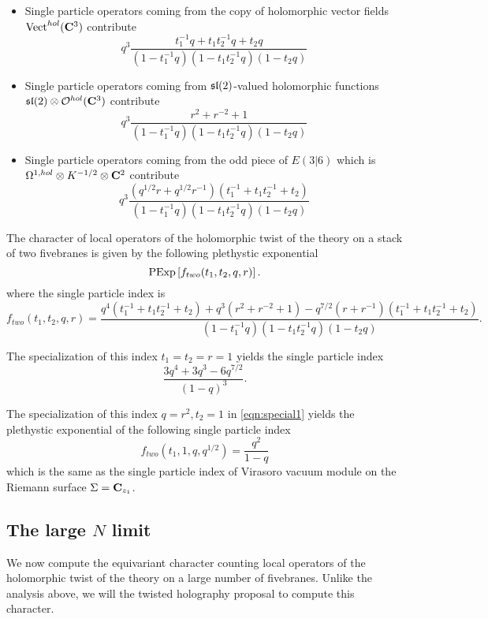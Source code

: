 \begin{itemize}
\item Single particle operators coming from the copy of holomorphic vector fields $\operatorname{Vect}^{hol}(\mathbf{C}^3)$ contribute
\[
q^3 \frac{t_1^{-1} q + t_1 t_2^{-1} q + t_2 q }{(1-t_1^{-1}q) (1-t_1 t_2^{-1} q) (1-t_2 q)} 
\]
\item Single particle operators coming from $\mathfrak{sl}(2)$-valued holomorphic functions $\mathfrak{sl}(2) \otimes \mathcal O^{hol}(\mathbf{C}^3)$ contribute
\[
q^3\frac{r^2 + r^{-2} + 1}{(1-t_1^{-1}q) (1-t_1 t_2^{-1} q) (1-t_2 q)} 
\]
\item Single particle operators coming from the odd piece of $E(3|6)$ which is $\Omega^{1,hol} \otimes K^{-1/2} \otimes \mathbf{C}^2$ contribute
\[
q^{3}\frac{(q^{1/2} r + q^{1/2} r^{-1})(t_1^{-1} + t_1t_2^{-1} + t_2)}{(1-t_1^{-1}q) (1-t_1 t_2^{-1} q) (1-t_2 q)}
\]
\end{itemize}

\begin{conj}
The character of local operators of the holomorphic twist of the theory on a stack of two fivebranes is given by the following plethystic exponential
\[
{\rm PExp} \left[f_{two} (t_1,t_2,q,r) \right] .
\]
where the single particle index is
\[
f_{two} (t_1,t_2,q,r) = \frac{q^4(t_1^{-1} + t_1 t_2^{-1}  + t_2) + q^3 (r^2 + r^{-2} + 1) - q^{7/2} (r + r^{-1})(t_1^{-1} + t_1t_2^{-1} + t_2)}{(1-t_1^{-1}q) (1-t_1 t_2^{-1} q) (1-t_2 q)} .
\]
\end{conj}

\parsec[]

The specialization of this index $t_1=t_2=r=1$ yields the single particle index
\[
\frac{3q^4 + 3 q^3 - 6 q^{7/2}}{(1-q)^3}. 
\]

\parsec[]

The specialization of this index $q=r^2, t_2=1$ in \eqref{eqn:special1} yields the plethystic exponential of the following single particle index
\[
f_{two}(t_1, 1, q, q^{1/2}) = \frac{q^2}{1-q} 
\]
which is the same as the single particle index of Virasoro vacuum module on the Riemann surface $\Sigma = \mathbf{C}_{z_1}$. 

\subsection{The large $N$ limit}

We now compute the equivariant character counting local operators of the holomorphic twist of the theory on a large number of fivebranes. 
Unlike the analysis above, we will the twisted holography proposal to compute this character. 

